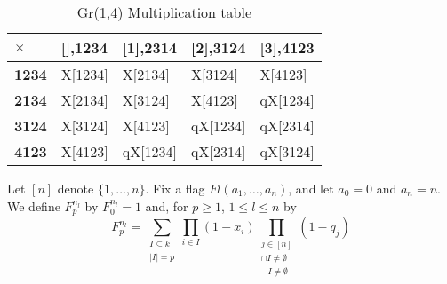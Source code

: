 \documentclass[11pt]{article}
\begin{document}
\begin{table}[!h]
\centering
\caption{Gr(1,4) Multiplication table}
\begin{tabular}{|p{3cm}|p{3cm}|p{3cm}|p{3cm}|p{3cm}|}
\hline
$\times$ & \textbf{[],1234} & \textbf{[1],2314}  & \textbf{[2],3124} & \textbf{[3],4123} \\ \hline 
\textbf{1234} & X[1234] & X[2134] & X[3124] & X[4123] \\ \hline 
\textbf{2134} & X[2134] & X[3124] & X[4123] & qX[1234] \\ \hline 
\textbf{3124} & X[3124] & X[4123] & qX[1234] & qX[2314] \\ \hline
\textbf{4123} & X[4123] & qX[1234] & qX[2314] & qX[3124] \\ \hline
\end{tabular}
\end{table}

\newpage

\begin{definition}
    Let $[n]$ denote $\{1, \ldots, n\}$. Fix a flag $Fl(a_1,\ldots,a_n)$, and let $a_0 = 0$ and $a_n = n$.  We define $F_p^{n_l}$ by $F_0^{n_l} = 1$ and, for $p\geq 1$, $1 \leq l \leq n$ by
    \begin{equation*}
        F_p^{n_l} = \sum_{\substack{I \subseteq k \\ |I| = p}} \prod_{i \in I}(1-x_i) \prod_{\substack{j \in [n] \\ [a_{j-1}+1, \ldots, a_j] \cap I \neq \emptyset \\ [a_{j}+1, \ldots, a_n] - I \neq \emptyset}}(1-q_j)
    \end{equation*}
\end{definition}
\end{document}
